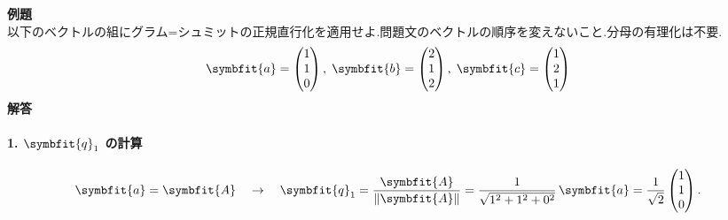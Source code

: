 \noindent
\textbf{例題}\\
以下のベクトルの組にグラム=シュミットの正規直行化を適用せよ.問題文のベクトルの順序を変えないこと.分母の有理化は不要.
\[\symbfit{a}=\begin{pmatrix}
        1 \\ 1 \\ 0
    \end{pmatrix},\;
    \symbfit{b}=\begin{pmatrix}
        2 \\ 1 \\ 2
    \end{pmatrix},\;
    \symbfit{c}=\begin{pmatrix}
        1 \\ 2 \\ 1
    \end{pmatrix}
\]
\textbf{解答}\\
\paragraph{1. $\symbfit{q}_1$ の計算}
    \[
    \symbfit{a} = \symbfit{A} \quad \rightarrow \quad
    \symbfit{q}_1 = \frac{\symbfit{A}}{\|\symbfit{A}\|}
        = \frac{1}{\sqrt{1^2+1^2+0^2}}\,\symbfit{a}
        = \frac{1}{\sqrt{2}}\begin{pmatrix}1\\1\\0\end{pmatrix}.
    \]


